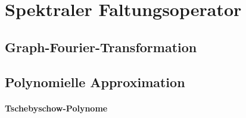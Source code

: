 \section{Spektraler Faltungsoperator}
\label{spektraler_faltungsoperator}

\cite{Shuman}
\cite{Defferrard}
\cite{Hammond}

\subsection{Graph-Fourier-Transformation}
\label{graph_fourier_transformation}

\subsection{Polynomielle Approximation}
\label{polynomielle_approximation}

\paragraph{Tschebyschow-Polynome}
\label{tschebyschow_polynome}
